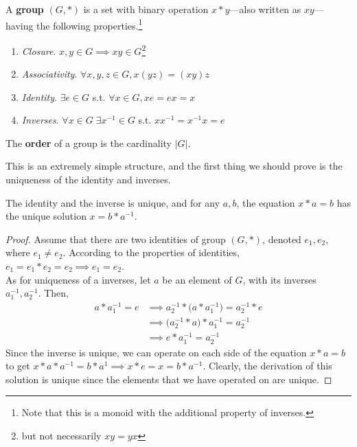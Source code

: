   \begin{definition}[Group]
    A \textbf{group} $(G, \ast)$ is a set with binary operation $x \ast y$---also written as $xy$---having the following properties.\footnote{Note that this is a monoid with the additional property of inverses.}
    \begin{enumerate}
      \item \textit{Closure}. $x, y \in G \implies xy \in G$\footnote{but not necessarily $xy  = yx$}
      \item \textit{Associativity}. $\forall x, y, z \in G, x(yz) = (xy)z$
      \item \textit{Identity}. $\exists e \in G$ s.t. $\forall x \in G, xe = ex = x$
      \item \textit{Inverses}. $\forall x \in G \; \exists x^{-1} \in G$ s.t. $x x^{-1} = x^{-1} x = e$
    \end{enumerate}
    The \textbf{order} of a group is the cardinality $|G|$. 
  \end{definition} 

  This is an extremely simple structure, and the first thing we should prove is the uniqueness of the identity and inverses. 

  \begin{lemma}
    The identity and the inverse is unique, and for any $a, b$, the equation $x*a = b$ has the unique solution $x = b* a^{-1}$.
  \end{lemma}
  \begin{proof}
     Assume that there are two identities of group $(G,*)$, denoted $e_{1}, e_{2}$, where $e_{1} \neq e_{2}$. According to the properties of identities, $e_{1} = e_{1} * e_{2} = e_{2} \implies e_{1} = e_{2}$. \\
    As for uniqueness of a inverses, let $a$ be an element of $G$, with its inverses $a_{1}^{-1}, a_{2}^{-1}$. Then, 
    \begin{align*}
      a * a_{1}^{-1} = e & \implies a_{2}^{-1} * \Big(a * a_{1}^{-1} \Big)= a_{2}^{-1} * e \\
       & \implies \Big(a_{2}^{-1} * a \Big) * a_{1}^{-1} = a_{2}^{-1} \\
       & \implies e * a_{1}^{-1} = a_{2}^{-1}
    \end{align*}
    Since the inverse is unique, we can operate on each side of the equation $x*a = b$ to get $x*a*a^{-1} = b*a^{1} \implies x * e = x = b*a^{-1}$. Clearly, the derivation of this solution is unique since the elements that we have operated on are unique.
  \end{proof} 
  

